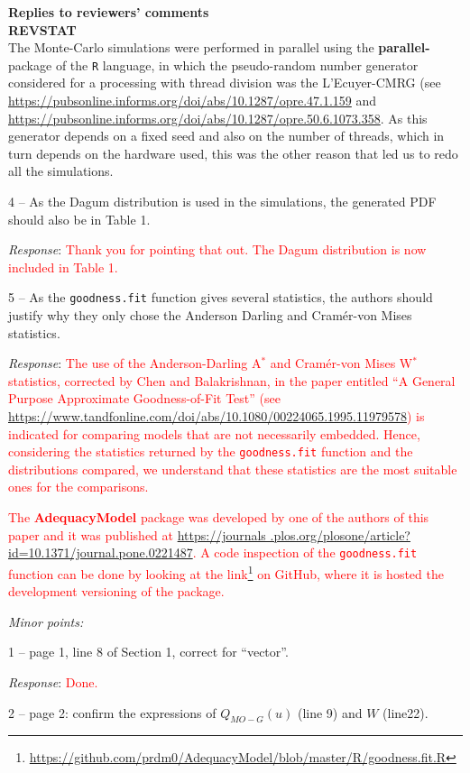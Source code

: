 \documentclass[version=last,12pt,{"maintainersDelight"}]{scrlttr2}
\renewcommand{\href}[2]{#2\footnote{\url{#1}}}
\begin{document}
\begin{letter}{\textbf{Replies to reviewers' comments}\\\textbf{REVSTAT}\\}
{The Monte-Carlo simulations were performed in parallel using 
the  \textbf{parallel-}package of the \texttt{R} language, in which the pseudo-random number generator considered for a processing with thread division was the L'Ecuyer-CMRG (see \url{https://pubsonline.informs.org/doi/abs/10.1287/opre.47.1.159} and \url{https://pubsonline.informs.org/doi/abs/10.1287/opre.50.6.1073.358}. As this generator depends on a fixed seed and also on the number of threads, which in turn depends on the hardware used, this was the other reason that led us to redo all the simulations.}

4 -- As the Dagum distribution is used in the simulations, the generated PDF should also be in Table 1.

\emph{Response}:
\textcolor{red}{Thank you for pointing that out. The Dagum distribution is now included in Table 1.}

5 -- As the \texttt{goodness.fit} function gives several statistics, the authors should justify why they only chose the Anderson Darling and Cram\'er-von Mises statistics.

\emph{Response}:
\textcolor{red}{The use of the Anderson-Darling  A$^*$ and Cram\'er-von Mises W$^*$  statistics, corrected by Chen and Balakrishnan, in the paper entitled ``A General Purpose Approximate Goodness-of-Fit Test'' (see   \url{https://www.tandfonline.com/doi/abs/10.1080/00224065.1995.11979578}) is indicated for comparing mo\-dels that are not necessarily embedded. Hence, considering the statistics returned by the \texttt{goodness.fit} function and the distributions compared, we understand that these statistics are the most suitable ones for 
the comparisons.}

\textcolor{red}{The \textbf{AdequacyModel} package was developed 
by one of the authors of this paper and it was published at \url{https://journals .plos.org/plosone/article?id=10.1371/journal.pone.0221487}. 
A code inspection of the \texttt{goodness.fit} function can be done by looking at the    \href{https://github.com/prdm0/AdequacyModel/blob/master/R/goodness.fit.R}{link} on GitHub, where it is hosted the development versioning of the package.}

\emph{Minor points:}

1 -- page 1, line 8 of Section 1, correct for ``vector''.

\emph{Response}: \textcolor{red}{Done.}

2 -- page 2: confirm the expressions of \(Q_{MO-G}(u)\) (line 9) and
\(W\) (line22).


\end{letter}
\end{document}
